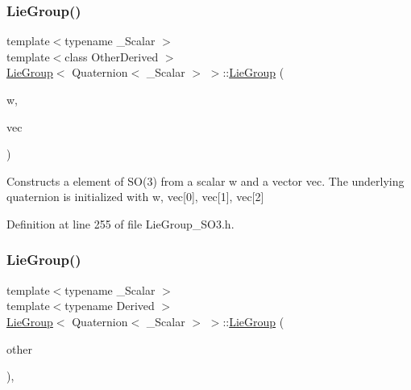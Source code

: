 \subsubsection{\texorpdfstring{Lie\+Group()}{LieGroup()}\hspace{0.1cm}{\footnotesize\ttfamily [5/9]}}
{\footnotesize\ttfamily template$<$typename \+\_\+\+Scalar $>$ \\
template$<$class Other\+Derived $>$ \\
\hyperlink{class_lie_group}{Lie\+Group}$<$ Quaternion$<$ \+\_\+\+Scalar $>$ $>$\+::\hyperlink{class_lie_group}{Lie\+Group} (\begin{DoxyParamCaption}\item[{\hyperlink{class_lie_group_3_01_quaternion_3_01___scalar_01_4_01_4_a5c9cc4f61c2a1870f44da7951225dc4e}{Scalar}}]{w,  }\item[{const Matrix\+Base$<$ Other\+Derived $>$ \&}]{vec }\end{DoxyParamCaption})\hspace{0.3cm}{\ttfamily [inline]}}

Constructs a element of S\+O(3) from a scalar {\ttfamily w} and a vector {\ttfamily vec}. The underlying quaternion is initialized with w, vec\mbox{[}0\mbox{]}, vec\mbox{[}1\mbox{]}, vec\mbox{[}2\mbox{]} 

Definition at line 255 of file Lie\+Group\+\_\+\+S\+O3.\+h.

\hypertarget{class_lie_group_3_01_quaternion_3_01___scalar_01_4_01_4_a19ea5d83094ec2d26d6e856d670b952d}{}\label{class_lie_group_3_01_quaternion_3_01___scalar_01_4_01_4_a19ea5d83094ec2d26d6e856d670b952d} 
\subsubsection{\texorpdfstring{Lie\+Group()}{LieGroup()}\hspace{0.1cm}{\footnotesize\ttfamily [6/9]}}
{\footnotesize\ttfamily template$<$typename \+\_\+\+Scalar $>$ \\
template$<$typename Derived $>$ \\
\hyperlink{class_lie_group}{Lie\+Group}$<$ Quaternion$<$ \+\_\+\+Scalar $>$ $>$\+::\hyperlink{class_lie_group}{Lie\+Group} (\begin{DoxyParamCaption}\item[{const Matrix\+Base$<$ Derived $>$ \&}]{other }\end{DoxyParamCaption})\hspace{0.3cm}{\ttfamily [inline]}, {\ttfamily [explicit]}}

